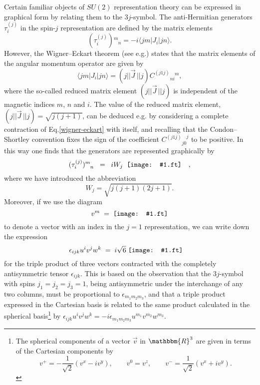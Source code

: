 \documentclass[graybox, secnum]{svmult}
\makeatletter
\newcommand{\ft}{pdf}        %
\newcommand{\makeSymbol}[1]{\mathord{\vcenter{\hbox{#1}}}}
\newcommand{\Symbol}[1]{\makeSymbol{\texttt{[image: \#1.\\ft]}}}
\newcommand{\bra}[1]{\langle #1 |}
\newcommand{\ket}[1]{|#1\rangle}
\newcommand{\eg}{e.g.\@\xspace}
\newcommand{\Eq}[1]{Eq.\@\xspace\eqref{#1}}
\newcommand{\updown}[2]{^{#1}_{\phantom{#1}#2}}
\newcommand{\downup}[2]{_{#1}^{\phantom{#1}#2}}
\newcommand{\R}{\mathbbm{R}}
\newcommand{\CG}[4]{C^{(#1#2)}{}\downup{#3}{#4}}
\newcommand{\Tau}[4]{({\tau^{(#1)}_{#2}}){}\updown{#3}{#4}}
\makeatother
\begin{document}
Certain familiar objects of $SU(2)$ representation theory can be expressed in graphical form by relating them to the $3j$-symbol. The anti-Hermitian generators $\tau_i^{(j)}$ in the spin-$j$ representation are defined by the matrix elements
\begin{equation}
	\Tau{j}{i}{m}{n} = -i\bra{jm}J_i\ket{jn}.
	\label{}
\end{equation}
However, the Wigner--Eckart theorem (see \eg \cite{brink1968angular, Edmonds, Varshalovich:1988ye}) states that the matrix elements of the angular momentum operator are given by
\begin{equation}
	\bra{jm}J_i\ket{jn} = (j||\vec J\,||j)\CG{j1}{j}{ni}{m},
	\label{wigner-eckart}
\end{equation}
where the so-called reduced matrix element $(j||\vec J\,||j)$ is independent of the magnetic indices $m$, $n$ and $i$. The value of the reduced matrix element, $(j||\vec J\,||j) = \sqrt{j(j+1)}$, can  be deduced \eg by considering a complete contraction of \Eq{wigner-eckart} with itself, and recalling that the Condon--Shortley convention fixes the sign of the coefficient $\CG{j1}{j}{j0}{j}$ to be positive. In this way one finds that the generators are represented graphically by
\begin{equation}
	\Tau{j}{i}{m}{n} \;\; = \;\; iW_j\;\;\Symbol{tau} \quad , 
	\label{g:tau}
\end{equation}
where we have introduced the abbreviation
\begin{equation}
	W_j = \sqrt{j(j+1)(2j+1)}.
	\label{}
\end{equation}
Moreover, if we use the diagram
\begin{equation}
	v^m \; = \; \Symbol{vector}
	\label{}
\end{equation}
to denote a vector with an index in the $j=1$ representation, we can write down the expression
\begin{equation}
	\epsilon_{ijk}u^iv^jw^k \; = \;i\sqrt{6}\;\Symbol{triple} \quad
	\label{g:triple}
\end{equation}
for the triple product of three vectors contracted with the completely antisymmetric tensor $\epsilon_{ijk}$. This is based on the observation that the $3j$-symbol with spins $j_1=j_2=j_3=1$, being antisymmetric under the interchange of any two columns, must be proportional to $\epsilon_{m_1m_2m_3}$, and that a triple product expressed in the Cartesian basis is related to the same product calculated in the spherical basis\footnote{The spherical components of a vector $\vec v$ in $\R^3$ are given in terms of the Cartesian components by
\[
	v^+ = -\frac{1}{\sqrt 2}(v^x - iv^y), \qquad v^0 = v^z, \qquad v^- = \frac{1}{\sqrt 2}(v^x+iv^y).
\]
} by $\epsilon_{ijk}u^iv^jw^k = -i\epsilon_{m_1m_2m_3}u^{m_1}v^{m_2}w^{m_3}$.
\end{document}
